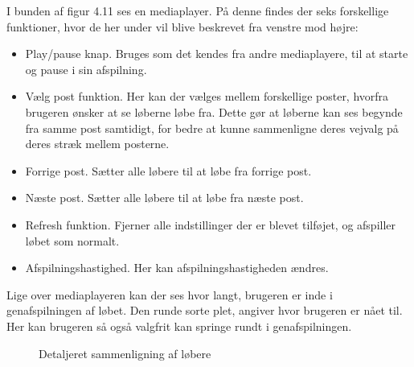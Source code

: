 I bunden af figur 4.11 ses en mediaplayer. På denne findes der seks forskellige funktioner, hvor de her under vil blive beskrevet fra venstre mod højre: 
\begin{itemize}
	\item Play/pause knap. Bruges som det kendes fra andre mediaplayere, til at starte og pause i sin afspilning.
	\item Vælg post funktion. Her kan der vælges mellem forskellige poster, hvorfra brugeren ønsker at se løberne løbe fra. Dette gør at løberne kan ses begynde fra samme post samtidigt, for bedre at kunne sammenligne deres vejvalg på deres stræk mellem posterne.
	\item Forrige post. Sætter alle løbere til at løbe fra forrige post.
	\item Næste post. Sætter alle løbere til at løbe fra næste post.
	\item Refresh funktion. Fjerner alle indstillinger der er blevet tilføjet, og afspiller løbet som normalt.
	\item Afspilningshastighed. Her kan afspilningshastigheden ændres.
\end{itemize}
Lige over mediaplayeren kan der ses hvor langt, brugeren er inde i genafspilningen af løbet. Den runde sorte plet, angiver hvor brugeren er nået til. Her kan brugeren så også valgfrit kan springe rundt i genafspilningen.

\begin{figure}[h]
	\centering
	\caption{Detaljeret sammenligning af løbere}
\end{figure}

